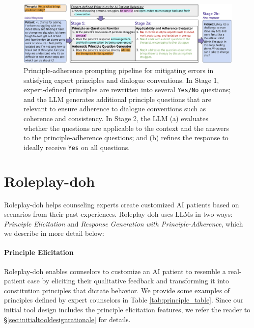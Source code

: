 \documentclass[11pt]{article}
\begin{document}
\begin{figure}[t]
    \centering
    \includegraphics[width=\textwidth]{figures/principle-adherence-stages-colorpop.png}
    \caption{\small{Principle-adherence prompting pipeline for mitigating errors in satisfying expert principles and dialogue conventions. In Stage 1, expert-defined principles are rewritten into several \texttt{Yes/No} questions; and the LLM generates additional principle questions that are relevant to ensure adherence to dialogue conventions such as coherence and consistency. In Stage 2, the LLM (a) evaluates whether the questions are applicable to the context and the answers to the principle-adherence questions; and (b) refines the response to ideally receive \texttt{Yes} on all questions.}
    \label{fig:principle-adherence-pipeline}}
\end{figure}
\vspace{-0.05in}
\section{Roleplay-doh} \vspace{-0.05in}
 \label{sec:roleplaydoh-final-tool}
Roleplay-doh helps counseling experts create customized AI patients based on scenarios from their past experiences. Roleplay-doh uses LLMs in two ways: \emph{Principle Elicitation} and \emph{Response Generation with Principle-Adherence}, which we describe in more detail below: 

\paragraph{Principle Elicitation} %
Roleplay-doh enables counselors to customize an AI patient to resemble a real-patient case by eliciting their qualitative feedback and transforming it into constitution principles that dictate behavior. We provide some examples of principles defined by expert counselors in Table \ref{tab:principle_table}. Since our initial tool design includes the principle elicitation features, we refer the reader to \S\ref{sec:initialtooldesignrationale} for details.
\end{document}
